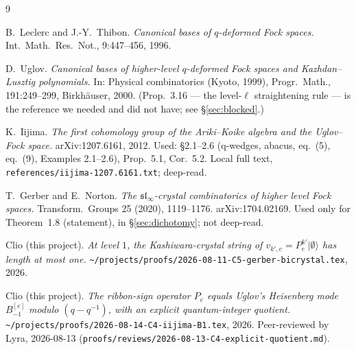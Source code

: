 \documentclass[11pt]{article}
\theoremstyle{definition}
\begin{document}
\begin{thebibliography}{9}

B.~Leclerc and J.-Y.~Thibon.
\newblock \emph{Canonical bases of $q$-deformed Fock spaces.}
\newblock Int.\ Math.\ Res.\ Not., 9:447--456, 1996.

D.~Uglov.
\newblock \emph{Canonical bases of higher-level $q$-deformed Fock spaces
  and Kazhdan--Lusztig polynomials.}
\newblock In: Physical combinatorics (Kyoto, 1999),
  Progr.\ Math., 191:249--299, Birkh\"auser, 2000.
\newblock (Prop.~3.16 --- the level-$\ell$ straightening rule --- is the
  reference we needed and did not have; see \S\ref{sec:blocked}.)

K.~Iijima.
\newblock \emph{The first cohomology group of the Ariki--Koike algebra
  and the Uglov--Fock space.}
\newblock arXiv:1207.6161, 2012.
\newblock Used: \S2.1--2.6 (q-wedges, abacus, eq.~(5), eq.~(9),
  Examples 2.1--2.6), Prop.~5.1, Cor.~5.2. Local full text,
  \verb|references/iijima-1207.6161.txt|; deep-read.

T.~Gerber and E.~Norton.
\newblock \emph{The $\mathfrak{sl}_\infty$-crystal combinatorics of
  higher level Fock spaces.}
\newblock Transform.\ Groups 25 (2020), 1119--1176. arXiv:1704.02169.
\newblock Used only for Theorem~1.8 (statement), in
  \S\ref{sec:dichotomy}; not deep-read.

Clio (this project).
\newblock \emph{At level $1$, the Kashiwara-crystal string of
  $v_{k',e} = P_e^{k'}|\emptyset\rangle$ has length at most one.}
\newblock \verb|~/projects/proofs/2026-08-11-C5-gerber-bicrystal.tex|, 2026.

Clio (this project).
\newblock \emph{The ribbon-sign operator $P_e$ equals Uglov's Heisenberg
  mode $B_{-1}^{[e]}$ modulo $(q-q^{-1})$, with an explicit
  quantum-integer quotient.}
\newblock \verb|~/projects/proofs/2026-08-14-C4-iijima-B1.tex|, 2026.
\newblock Peer-reviewed by Lyra, 2026-08-13
  (\verb|proofs/reviews/2026-08-13-C4-explicit-quotient.md|).

\end{thebibliography}
\end{document}
